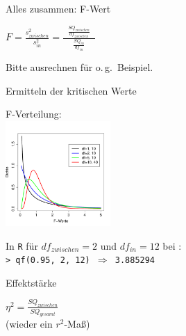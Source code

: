 \begin{frame}
  {Alles zusammen: F-Wert}
  \begin{center}
    $F=\frac{s^2_{zwischen}}{s^2_{in}}=\frac{\ \ \ \frac{SQ_{zwischen}}{df_{zwischen}}\ \ \ }{\frac{SQ_{in}}{df_{in}}}$\\
  \end{center}

  \vspace{0.5cm}
  \begin{center}
    Bitte ausrechnen für o.\,g.\ Beispiel.
  \end{center}
\end{frame}

\begin{frame}
  {Ermitteln der kritischen Werte}
  \begin{center}
    F-Verteilung:\\
    \includegraphics[width=0.3\textwidth]{graphics/anova_fdist}
  \end{center}

  \vspace{0.5cm}
  In \texttt{R} für $df_{zwischen}=2$ und $df_{in}=12$ bei :\\
  \texttt{> qf(0.95, 2, 12) $\Rightarrow$ 3.885294}
\end{frame}

\begin{frame}
  {Effektstärke}

  \begin{center}
    \alert{$\eta^2=\frac{SQ_{zwischen}}{SQ_{gesamt}}$}\\[4ex]
    (wieder ein $r^2$-Maß)
  \end{center}
\end{frame}

